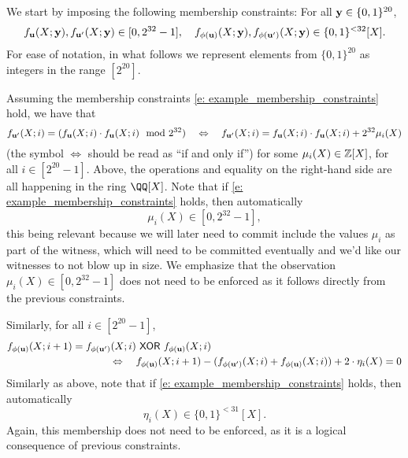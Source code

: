 \documentclass[11pt,letterpaper,usenames,dvipsnames]{article}
\newcommand{\albert}[1]{\textcolor{teal}{Albert: {#1}}}
\newcommand{\alberturgent}[1]{\textcolor{red}{Albert: {#1}}}
\begin{document}
We start by imposing the following membership constraints: For all $\mathbf{y}\in \{0,1\}^{20}$,
%
\begin{equation}\label{e: example_membership_constraints}
f_{\mathbf{u}}(X;\mathbf{y}), f_{\mathbf{u}'}(X;\mathbf{y}) \in [0,2^{32}-1], \quad f_{\phi(\mathbf{u})}(X;\mathbf{y}), f_{\phi(\mathbf{u}')}(X;\mathbf{y}) \in \{0,1\}^{<32}[X].
\end{equation}
%
For ease of notation, in what follows we represent elements from $\{0,1\}^{20}$ as integers in the range $[2^{20}]$. 

Assuming the membership constraints \eqref{e: example_membership_constraints} hold, we have that  
%
$$
f_{\mathbf{u}'}(X; i)= (f_{\mathbf{u}}(X;i)\cdot f_{\mathbf{u}}(X;i) \mod 2^{32}) \quad \Leftrightarrow  \quad f_{\mathbf{u}'}(X; i)= f_{\mathbf{u}}(X;i)\cdot f_{\mathbf{u}}(X;i) + 2^{32} \mu_i(X)
$$
(the symbol $\Leftrightarrow$ should be read as ``if and only if'')
for some $\mu_i(X)\in \mathbb{Z}[X]$, for all $i \in [2^{20}-1]$. Above, the operations and equality on the right-hand side  are all happening in the ring $\QQ[X]$.   Note that if \eqref{e: example_membership_constraints} holds, then automatically $$\mu_i(X) \in [0, 2^{32}-1],$$
this being relevant because we will later need to commit include the values $\mu_i$ as part of the witness, which will need to be committed eventually and we'd like our witnesses to not blow up in size. We emphasize that the observation $\mu_i(X) \in [0, 2^{32}-1]$  does not need to be enforced as it follows  directly from the previous constraints.


Similarly, for all $i\in [2^{20}-1]$,
%
\begin{align*}
&f_{\phi(\mathbf{u})}(X; i+1)= f_{\phi(\mathbf{u}')}(X;i)\ \mathsf{XOR}\  f_{\phi(\mathbf{u})}(X;i)\\ &\quad \quad \quad \quad \quad \quad \quad \quad \quad \quad \Leftrightarrow \quad  f_{\phi(\mathbf{u})}(X; i+1) - (f_{\phi(\mathbf{u}')}(X;i) + f_{\phi(\mathbf{u})}(X;i)) + 2\cdot \eta_i(X) =0
\end{align*}
Similarly as above, note that if \eqref{e: example_membership_constraints} holds, then automatically $$\eta_i(X) \in \{0,1\}^{<31}[X].$$  Again, this membership does not need to be enforced, as it is a logical consequence of previous constraints.
\end{document}
